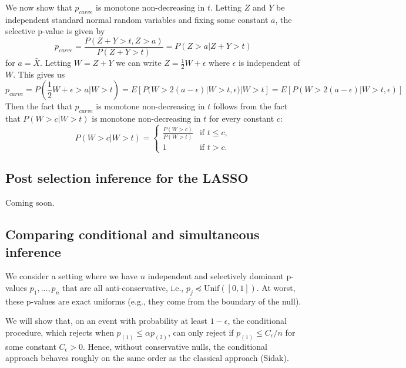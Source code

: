 \documentclass{article}
\begin{document}
\begin{appendix}
We now show that $p_{carve}$ is monotone non-decreasing in $t$. Letting $Z$ and $Y$ be independent standard normal random variables and fixing some constant $a$, the selective p-value is given by 
\begin{equation*}
   p_{carve} = \frac{P(Z + Y > t, Z > a)}{P(Z + Y > t)} = P(Z > a | Z + Y > t)
\end{equation*}
for $a = \bar{X}$. Letting $W = Z + Y$ we can write $Z = \frac{1}{2}W +\epsilon$ where $\epsilon$ is independent of $W$. This gives us 
\begin{equation*}
    p_{carve} = P(\frac{1}{2} W + \epsilon > a | W > t) = E[P(W > 2(a - \epsilon)| W > t, \epsilon)| W > t ] = E[P(W > 2(a - \epsilon)| W > t, \epsilon)]
\end{equation*}
Then the fact that $p_{carve}$ is monotone non-decreasing in $t$ follows from the fact that $P(W > c | W > t)$ is monotone non-decreasing in $t$ for every constant $c$:
\begin{equation*}
{P(W > c |W >t)} = \begin{cases} 
\frac{P(W > c)}{P(W > t)} & \text{if } t \leq c, \\
1 & \text{if } t > c.
\end{cases}
\end{equation*}

\subsection{Post selection inference for the LASSO}
\label{sec:lasso_appdx}

Coming soon. 

\subsection{Comparing conditional and simultaneous inference}
\label{sec:beta_dist_appdx}

We consider a setting where we have $n$ independent and selectively dominant p-values $p_1, \dots, p_n$ that are all anti-conservative, i.e.,  $p_j \preceq \text{Unif}([0, 1])$. At worst, these p-values are exact uniforms (e.g., they come from the boundary of the null). 

We will show that, on an event with probability at least $1-\epsilon$, the conditional procedure, which rejects when $p_{(1)} \leq \alpha p_{(2)}$, can only reject if $p_{(1)} \leq C_{\epsilon}/n$ for some constant $C_{\epsilon} > 0$. Hence, without conservative nulls, the conditional approach behaves roughly on the same order as the classical approach (Sidak).   


\end{appendix}
\end{document}
